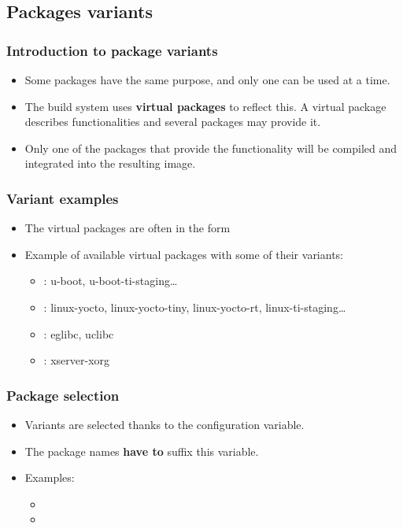 \subsection{Packages variants}

\begin{frame}
  \frametitle{Introduction to package variants}
  \begin{itemize}
    \item Some packages have the same purpose, and only one can be
      used at a time.
    \item The build system uses {\bf virtual packages} to reflect
      this.  A virtual package describes functionalities and several
      packages may provide it.
    \item Only one of the packages that provide the functionality will
    be compiled and integrated into the resulting image.
  \end{itemize}
\end{frame}

\begin{frame}
  \frametitle{Variant examples}
  \begin{itemize}
    \item The virtual packages are often in the form
    \item Example of available virtual packages with some of their
      variants:
      \begin{itemize}
        \item {}: u-boot,
          u-boot-ti-staging\dots
        \item {}: linux-yocto, linux-yocto-tiny,
          linux-yocto-rt, linux-ti-staging\dots
        \item {}: eglibc, uclibc
        \item {}: xserver-xorg
      \end{itemize}
  \end{itemize}
\end{frame}

\begin{frame}
  \frametitle{Package selection}
  \begin{itemize}
    \item Variants are selected thanks to the
       configuration variable.
    \item The package names {\bf have to} suffix this variable.
    \item Examples:
    \begin{itemize}
      \item {}
      \item {}
    \end{itemize}
  \end{itemize}
\end{frame}

